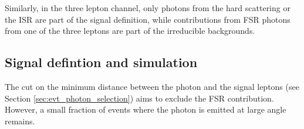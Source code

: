 Similarly, in the three lepton channel, only photons from the hard scattering or the ISR are part of the signal definition,
while contributions from FSR photons from one of the three leptons are part of the irreducible backgrounds.

\subsection{Signal defintion and simulation}
The cut on the minimum \DR{} distance between the photon and the signal leptons (see Section \ref{sec:evt_photon_selection})
aims to exclude the FSR contribution.
However, a small fraction of events where the photon is emitted at large angle remains. 
